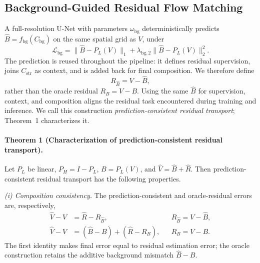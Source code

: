 \subsection{Background-Guided Residual Flow Matching}
A full-resolution U-Net \cite{ronneberger2015unet} with parameters $\omega_{\mathrm{bg}}$ deterministically predicts $\hat B=f_{\mathrm{bg}}(C_{\mathrm{bg}})$ on the same spatial grid as $V$, under
\begin{equation}
\mathcal L_{\mathrm{bg}}
=
\|\hat B-P_L(V)\|_1+\lambda_{\mathrm{bg},2}\|\hat B-P_L(V)\|_2^2.
\label{eq:background-loss}
\end{equation}
The prediction is reused throughout the pipeline: it defines residual supervision, joins $C_{\mathrm{str}}$ as context, and is added back for final composition. We therefore define
\begin{equation}
R_{\hat B}=V-\hat B,
\label{eq:prediction-consistent-residual}
\end{equation}
rather than the oracle residual $R_B=V-B$. Using the same $\hat B$ for supervision, context, and composition aligns the residual task encountered during training and inference. We call this construction \emph{prediction-consistent residual transport}; Theorem~1 characterizes it.




\paragraph{Theorem 1 (Characterization of prediction-consistent residual transport).}
Let $P_L$ be linear, $P_H=I-P_L$, $B=P_L(V)$, and $\hat V=\hat B+\hat R$. Then prediction-consistent residual transport has the following properties.

\textit{(i) Composition consistency.}
The prediction-consistent and oracle-residual errors are, respectively,
\begin{equation}
\begin{aligned}
\hat V-V&=\hat R-R_{\hat B},
&&R_{\hat B}=V-\hat B,\\
\hat V-V&=(\hat B-B)+(\hat R-R_B),
&&R_B=V-B.
\end{aligned}
\label{eq:composition-consistent}
\end{equation}
The first identity makes final error equal to residual estimation error; the oracle construction retains the additive background mismatch $\hat B-B$.


